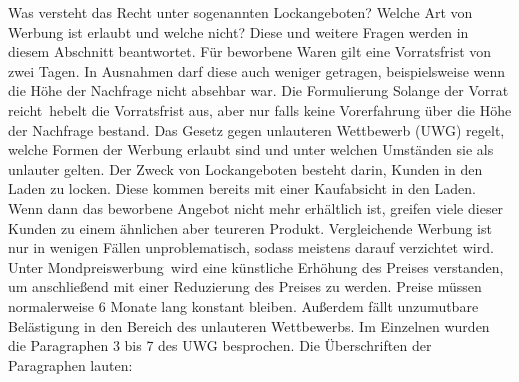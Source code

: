 Was versteht das Recht unter sogenannten \ql Lockangeboten\qr? Welche Art von Werbung ist erlaubt und welche nicht? Diese und weitere Fragen werden in diesem Abschnitt beantwortet. Für beworbene Waren gilt eine Vorratsfrist von zwei Tagen. In Ausnahmen darf diese auch weniger getragen, beispielsweise wenn die Höhe der Nachfrage nicht absehbar war. Die Formulierung \ql Solange der Vorrat reicht\qr\ hebelt die Vorratsfrist aus, aber nur falls keine Vorerfahrung über die Höhe der Nachfrage bestand. Das Gesetz gegen unlauteren Wettbewerb (UWG) regelt, welche Formen der Werbung erlaubt sind und unter welchen Umständen sie als unlauter gelten. Der Zweck von Lockangeboten besteht darin, Kunden in den Laden zu locken. Diese kommen bereits mit einer Kaufabsicht in den Laden. Wenn dann das beworbene Angebot nicht mehr erhältlich ist, greifen viele dieser Kunden zu einem ähnlichen aber teureren Produkt. Vergleichende Werbung ist nur in wenigen Fällen unproblematisch, sodass meistens darauf verzichtet wird. Unter \ql Mondpreiswerbung\qr\ wird eine künstliche Erhöhung des Preises verstanden, um anschließend mit einer Reduzierung des Preises zu werden. Preise müssen normalerweise 6 Monate lang konstant bleiben. Außerdem fällt unzumutbare Belästigung in den Bereich des unlauteren Wettbewerbs. Im Einzelnen wurden die Paragraphen 3 bis 7 des UWG besprochen. Die Überschriften der Paragraphen lauten:


